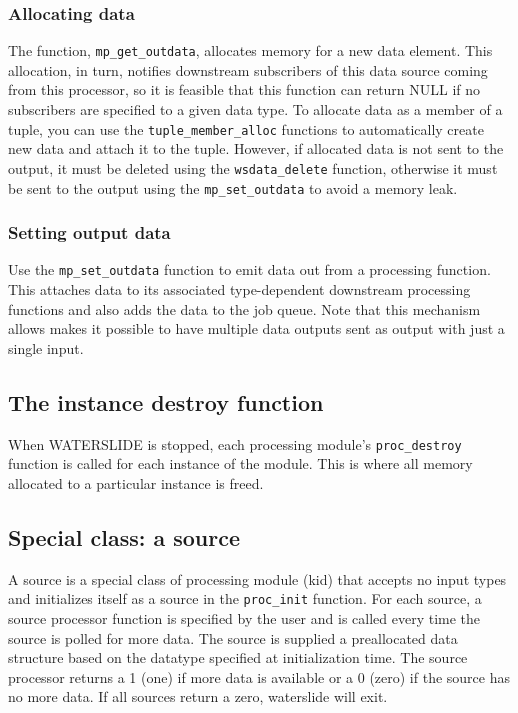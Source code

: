 \documentclass[11pt]{article}
\begin{document}
\subsubsection{Allocating data}
The function, \texttt{mp\_get\_outdata}, allocates memory for a new data 
element.  This allocation, in turn, notifies downstream subscribers of this 
data source coming from this processor, so it is feasible that this function 
can return NULL if no subscribers are specified to a given data type. To 
allocate data as a member of a tuple, you can use the
\texttt{tuple\_member\_alloc} functions to automatically create new data and 
attach it to the tuple.  However, if allocated data is not sent to the output, 
it must be deleted using the \texttt{wsdata\_delete} function, otherwise it 
must be sent to the output using the \texttt{mp\_set\_outdata} to avoid a 
memory leak.

\subsubsection{Setting output data}
Use the \texttt{mp\_set\_outdata} function to emit data out from a processing 
function.  This attaches data to its associated type-dependent downstream 
processing functions and also adds the data to the job queue.  Note that this 
mechanism allows makes it possible to have multiple data outputs sent as output
with just a single input.

\subsection{The instance destroy function}
When WATERSLIDE is stopped, each processing module's \texttt{proc\_destroy} 
function is called for each instance of the module. This is where all memory 
allocated to a particular instance is freed.

\subsection{Special class: a source}
A source is a special class of processing module (kid) that accepts no input 
types and initializes itself as a source in the \texttt{proc\_init} function.
For each source, a source processor function is specified by the user and is 
called every time the source is polled for more data.  The source is supplied 
a preallocated data structure based on the datatype specified at 
initialization time. The source processor returns a 1 (one) if more data is 
available or a 0 (zero) if the source has no more data.  If all sources return
a zero, waterslide will exit.
\end{document}
